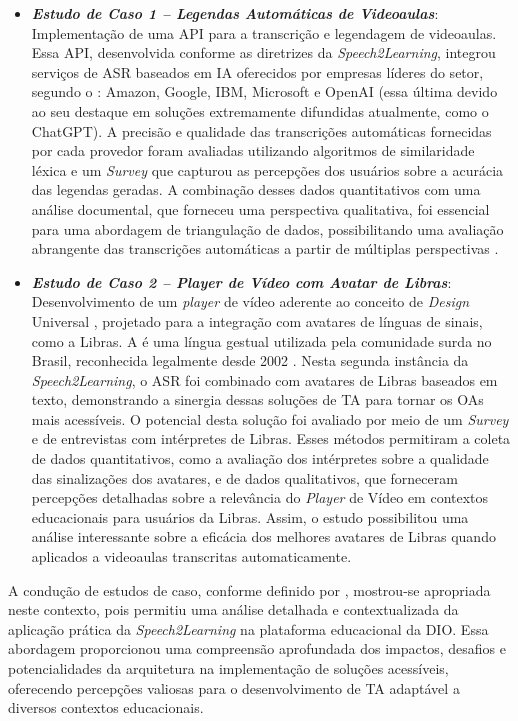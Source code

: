 \begin{itemize}
\item \textbf{\textit{Estudo de Caso 1 -- Legendas Automáticas de Videoaulas}}: Implementação de uma API para a transcrição e legendagem de videoaulas. Essa API, desenvolvida conforme as diretrizes da \textit{Speech2Learning}, integrou serviços de ASR baseados em IA oferecidos por empresas líderes do setor, segundo o : Amazon, Google, IBM, Microsoft e OpenAI (essa última devido ao seu destaque em soluções extremamente difundidas atualmente, como o ChatGPT). A precisão e qualidade das transcrições automáticas fornecidas por cada provedor foram avaliadas utilizando algoritmos de similaridade léxica e um \textit{Survey} que capturou as percepções dos usuários sobre a acurácia das legendas geradas. A combinação desses dados quantitativos com uma análise documental, que forneceu uma perspectiva qualitativa, foi essencial para uma abordagem de triangulação de dados, possibilitando uma avaliação abrangente das transcrições automáticas a partir de múltiplas perspectivas \cite{FalvoJr2023_HICSS, FalvoJr2024_FIE}.

\item \textbf{\textit{Estudo de Caso 2 -- Player de Vídeo com Avatar de Libras}}: Desenvolvimento de um \textit{player} de vídeo aderente ao conceito de \textit{Design} Universal \cite{GovBr2023}, projetado para a integração com avatares de línguas de sinais, como a Libras. A  é uma língua gestual utilizada pela comunidade surda no Brasil, reconhecida legalmente desde 2002 \cite{Quadros2017, Quadros2019, Honora2021}. Nesta segunda instância da \textit{Speech2Learning}, o ASR foi combinado com avatares de Libras baseados em texto, demonstrando a sinergia dessas soluções de TA para tornar os OAs mais acessíveis. O potencial desta solução foi avaliado por meio de um \textit{Survey} e de entrevistas com intérpretes de Libras. Esses métodos permitiram a coleta de dados quantitativos, como a avaliação dos intérpretes sobre a qualidade das sinalizações dos avatares, e de dados qualitativos, que forneceram percepções detalhadas sobre a relevância do \textit{Player} de Vídeo em contextos educacionais para usuários da Libras. Assim, o estudo possibilitou uma análise interessante sobre a eficácia dos melhores avatares de Libras quando aplicados a videoaulas transcritas automaticamente.
\end{itemize}

A condução de estudos de caso, conforme definido por , mostrou-se apropriada neste contexto, pois permitiu uma análise detalhada e contextualizada da aplicação prática da \textit{Speech2Learning} na plataforma educacional da DIO. Essa abordagem proporcionou uma compreensão aprofundada dos impactos, desafios e potencialidades da arquitetura na implementação de soluções acessíveis, oferecendo percepções valiosas para o desenvolvimento de TA adaptável a diversos contextos educacionais.

